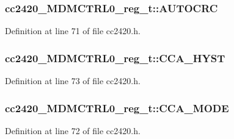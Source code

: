 \subsubsection[{\texorpdfstring{A\+U\+T\+O\+C\+RC}{AUTOCRC}}]{ cc2420\+\_\+\+M\+D\+M\+C\+T\+R\+L0\+\_\+reg\+\_\+t\+::\+A\+U\+T\+O\+C\+RC}\hypertarget{structcc2420___m_d_m_c_t_r_l0__reg__t_abbe426036ac61bbf810c2082d73bda01}{}\label{structcc2420___m_d_m_c_t_r_l0__reg__t_abbe426036ac61bbf810c2082d73bda01}


Definition at line 71 of file cc2420.\+h.

\subsubsection[{\texorpdfstring{C\+C\+A\+\_\+\+H\+Y\+ST}{CCA_HYST}}]{ cc2420\+\_\+\+M\+D\+M\+C\+T\+R\+L0\+\_\+reg\+\_\+t\+::\+C\+C\+A\+\_\+\+H\+Y\+ST}\hypertarget{structcc2420___m_d_m_c_t_r_l0__reg__t_a77fbf4316378d718c40e7837182fb96c}{}\label{structcc2420___m_d_m_c_t_r_l0__reg__t_a77fbf4316378d718c40e7837182fb96c}


Definition at line 73 of file cc2420.\+h.

\subsubsection[{\texorpdfstring{C\+C\+A\+\_\+\+M\+O\+DE}{CCA_MODE}}]{ cc2420\+\_\+\+M\+D\+M\+C\+T\+R\+L0\+\_\+reg\+\_\+t\+::\+C\+C\+A\+\_\+\+M\+O\+DE}\hypertarget{structcc2420___m_d_m_c_t_r_l0__reg__t_acb90ca84a1e856074b91e0431fae71f1}{}\label{structcc2420___m_d_m_c_t_r_l0__reg__t_acb90ca84a1e856074b91e0431fae71f1}


Definition at line 72 of file cc2420.\+h.

